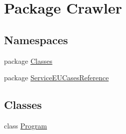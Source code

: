 \hypertarget{namespace_crawler}{\section{Package Crawler}
\label{namespace_crawler}
}
\subsection*{Namespaces}
\begin{DoxyCompactItemize}
\item 
package \hyperlink{namespace_crawler_1_1_classes}{Classes}
\item 
package \hyperlink{namespace_crawler_1_1_service_e_u_cases_reference}{Service\-E\-U\-Cases\-Reference}
\end{DoxyCompactItemize}
\subsection*{Classes}
\begin{DoxyCompactItemize}
\item 
class \hyperlink{class_crawler_1_1_program}{Program}
\end{DoxyCompactItemize}
